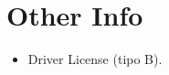 \documentclass[11pt,a4paper,sans]{moderncv}        %
\begin{document}
\section{Other Info}
\begin{itemize}
    \item Driver License (tipo B).
\end{itemize}

\nocite{*}



\end{document}
